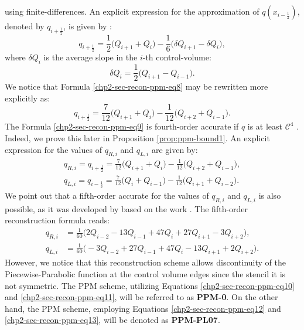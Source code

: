 using finite-differences.
An explicit expression for the approximation of $q(x_{i-\frac{1}{2}})$, denoted by $q_{i+\frac{1}{2}}$, is given by \citep{colella:1984}:
\begin{equation}
	\label{chp2-sec-recon-ppm-eq7}
	q_{i+\frac{1}{2}} = \frac{1}{2} \bigg( Q_{i+1} + Q_{i} \bigg) - \frac{1}{6} \bigg( \delta Q_{i+1} - \delta Q_{i}\bigg),
\end{equation}
where $\delta Q_{i}$ is the average slope in the $i$-th control-volume:
\begin{equation}
	\label{chp2-sec-recon-ppm-eq8}
	\delta Q_{i} = \frac{1}{2} \bigg( Q_{i+1} - Q_{i-1} \bigg).
\end{equation}
We notice that Formula \eqref{chp2-sec-recon-ppm-eq8} may be rewritten more explicitly as:
\begin{equation}
	\label{chp2-sec-recon-ppm-eq9}
	q_{i+\frac{1}{2}} = \frac{7}{12} \bigg( Q_{i+1} + Q_{i} \bigg) - \frac{1}{12} \bigg(  Q_{i+2} +Q_{i-1}\bigg).
\end{equation}
The Formula \eqref{chp2-sec-recon-ppm-eq9} is fourth-order accurate if
$q$ is at least $\mathcal{C}^4$ \citep{colella:1984}. Indeed, we
prove this later in Proposition \ref{prop:ppm-bound1}.
An explicit expression for the values of $q_{R,i}$ and $q_{L,i}$ are given by:
\begin{align}
	\label{chp2-sec-recon-ppm-eq10}
	q_{R,i} = q_{i+\frac{1}{2}} = \frac{7}{12} \bigg( Q_{i+1} + Q_{i} \bigg) - \frac{1}{12} \bigg(  Q_{i+2} +Q_{i-1}\bigg), \\
	\label{chp2-sec-recon-ppm-eq11}
	q_{L,i} = q_{i-\frac{1}{2}} = \frac{7}{12} \bigg( Q_{i} + Q_{i-1} \bigg) - \frac{1}{12} \bigg(  Q_{i+1} +Q_{i-2}\bigg).
\end{align}
We point out that a fifth-order accurate for the values of $q_{R,i}$ and $q_{L,i}$
is also possible, as it was developed by \citet{putman:2007} 
based on the work \citet{suresh:1997}. The fifth-order reconstruction formula reads:
\begin{align}
	\label{chp2-sec-recon-ppm-eq12}
	q_{R,i} &= \frac{1}{60} \bigg( 2Q_{i-2} - 13Q_{i-1} + 47Q_{i} + 27Q_{i+1} - 3Q_{i+2}\bigg), \\
	\label{chp2-sec-recon-ppm-eq13}
	q_{L,i} &= \frac{1}{60} \bigg(-3Q_{i-2} + 27Q_{i-1} + 47Q_{i} - 13Q_{i+1} + 2Q_{i+2}\bigg).
\end{align}
However, we notice that this reconstruction scheme allows discontinuity of the 
Piecewise-Parabolic function at the control volume edges since the stencil it is not symmetric.
The PPM scheme, utilizing Equations \eqref{chp2-sec-recon-ppm-eq10} and \eqref{chp2-sec-recon-ppm-eq11},
will be referred to as \textbf{PPM-0}. On the other hand, the PPM scheme, employing Equations 
\eqref{chp2-sec-recon-ppm-eq12} and \eqref{chp2-sec-recon-ppm-eq13}, will be denoted as \textbf{PPM-PL07}.
